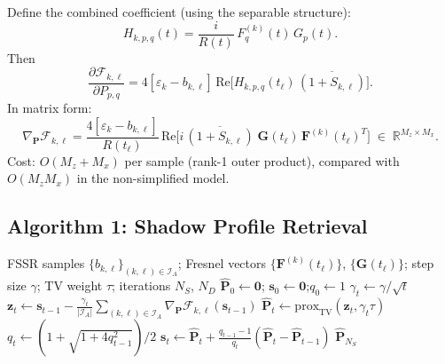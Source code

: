 \documentclass[11pt,a4paper]{article}
\newcommand{\R}{\mathbb{R}}
\newcommand{\TV}{\mathrm{TV}}
\begin{document}
Define the combined coefficient (using the separable structure):
\begin{equation}
  H_{k,p,q}(t)=\frac{i}{R(t)}\,
  F_q^{(k)}(t)\,G_p(t).
  \label{eq:Hpq}
\end{equation}
Then
\begin{equation}
  \frac{\partial\mathcal{F}_{k,\ell}}{\partial P_{p,q}}
  =4[\varepsilon_k{-}b_{k,\ell}]\,
  \mathrm{Re}\!\bigl[H_{k,p,q}(t_\ell)\,
  \overline{(1{+}S_{k,\ell})}\bigr].
  \label{eq:grad}
\end{equation}
In matrix form:
\begin{equation}
  \nabla_{\mathbf{P}}\mathcal{F}_{k,\ell}
  =\frac{4[\varepsilon_k{-}b_{k,\ell}]}{R(t_\ell)}\,
  \mathrm{Re}\!\bigl[i\,\overline{(1{+}S_{k,\ell})}\;
  \mathbf{G}(t_\ell)\,\mathbf{F}^{(k)}(t_\ell)^T\bigr]
  \;\in\;\R^{M_z\times M_x}.
  \label{eq:grad_matrix}
\end{equation}
Cost: $O(M_z+M_x)$ per sample (rank-1 outer product), compared with
$O(M_zM_x)$ in the non-simplified model.

\subsection{Algorithm 1: Shadow Profile Retrieval}

\begin{algorithm}[H]
\caption{Gradient descent with TV denoising}
\label{alg:profile}
\begin{algorithmic}[1]
\Require FSSR samples $\{b_{k,\ell}\}_{(k,\ell)\in\mathcal{I}_A}$;
Fresnel vectors
$\{\mathbf{F}^{(k)}(t_\ell)\}$, $\{\mathbf{G}(t_\ell)\}$;
step size $\gamma$; TV weight $\tau$; iterations $N_S$, $N_D$
\State $\hat{\mathbf{P}}_0\leftarrow\mathbf{0}$;\;
$\mathbf{s}_0\leftarrow\mathbf{0}$;\;$q_0\leftarrow 1$
  \State $\gamma_t\leftarrow\gamma/\sqrt{t}$
  \State $\mathbf{z}_t\leftarrow\mathbf{s}_{t-1}
    -\frac{\gamma_t}{|\mathcal{I}_A|}
    \sum_{(k,\ell)\in\mathcal{I}_A}
    \nabla_{\mathbf{P}}\mathcal{F}_{k,\ell}
    (\mathbf{s}_{t-1})$
  \State $\hat{\mathbf{P}}_t\leftarrow
    \mathrm{prox}_{\TV}(\mathbf{z}_t,\gamma_t\tau)$
  \State $q_t\leftarrow(1{+}\sqrt{1{+}4q_{t-1}^2})/2$
  \State $\mathbf{s}_t\leftarrow\hat{\mathbf{P}}_t
    +\frac{q_{t-1}-1}{q_t}
    (\hat{\mathbf{P}}_t{-}\hat{\mathbf{P}}_{t-1})$
\EndFor
\State \Return $\hat{\mathbf{P}}_{N_S}$
\end{algorithmic}
\end{algorithm}
\end{document}
